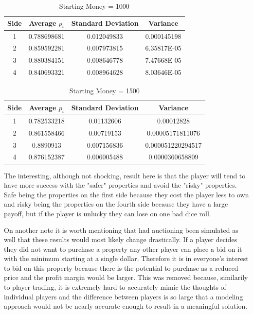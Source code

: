 \documentclass{article}
\begin{document}
\begin{table}[h!]
\centering
\caption{Starting Money = 1000}
\label{tab:table1}
\begin{tabular}{|c|c|c|c|}
\hline
Side  & Average $p_i$ & Standard Deviation & Variance\\
\hline
1 &  0.788698681 & 0.012049833 & 0.000145198\\
2 &  0.859592281 & 0.007973815 & 6.35817E-05\\
3 & 0.880384151 & 0.008646778 & 7.47668E-05\\
4 & 0.840693321 & 0.008964628 & 8.03646E-05\\
\hline
\end{tabular}
\end{table}

\begin{table}[h!]
\centering
\caption{Starting Money = 1500}
\label{tab:table1}
\begin{tabular}{|c|c|c|c|}
\hline
Side  & Average $p_i$ & Standard Deviation & Variance\\
\hline
1 &  0.782533218 & 0.01132606 & 0.00012828\\
2 &  0.861558466 & 0.00719153 & 0.00005171811076\\
3 & 0.8890913 & 0.007156836 & 0.000051220294517\\
4 & 0.876152387 & 0.006005488 & 0.0000360658809\\
\hline
\end{tabular}
\end{table}

The interesting, although not shocking, result here is that the player will tend to have more success with the "safer" properties and avoid the "risky" properties.  Safe being the properties on the first side because they cost the player less to own and risky being the properties on the fourth side because they have a large payoff, but if the player is unlucky they can lose on one bad dice roll.

On another note it is worth mentioning that had auctioning been simulated as well that these results would most likely change drastically.  If a player decides they did not want to purchase a property any other player can place a bid on it with the minimum starting at a single dollar.  Therefore it is in everyone's interest to bid on this property because there is the potential to purchase as a reduced price and the profit margin would be larger.  This was removed because, similarily to player trading, it is extremely hard to accurately mimic the thoughts of individual players and the difference between players is so large that a modeling approach would not be nearly accurate enough to result in a meaningful solution.
\end{document}
